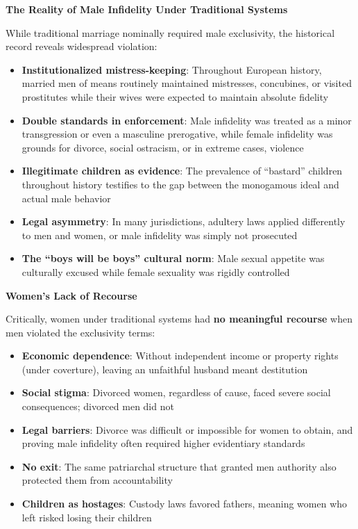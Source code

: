 \documentclass[12pt,openany]{book}
\numberwithin{equation}{chapter}
\begin{document}
\textbf{The Reality of Male Infidelity Under Traditional Systems}

While traditional marriage nominally required male exclusivity, the historical record reveals widespread violation:

\begin{itemize}
    \item \textbf{Institutionalized mistress-keeping}: Throughout European history, married men of means routinely maintained mistresses, concubines, or visited prostitutes while their wives were expected to maintain absolute fidelity
    \item \textbf{Double standards in enforcement}: Male infidelity was treated as a minor transgression or even a masculine prerogative, while female infidelity was grounds for divorce, social ostracism, or in extreme cases, violence
    \item \textbf{Illegitimate children as evidence}: The prevalence of ``bastard'' children throughout history testifies to the gap between the monogamous ideal and actual male behavior
    \item \textbf{Legal asymmetry}: In many jurisdictions, adultery laws applied differently to men and women, or male infidelity was simply not prosecuted
    \item \textbf{The ``boys will be boys'' cultural norm}: Male sexual appetite was culturally excused while female sexuality was rigidly controlled
\end{itemize}

\textbf{Women's Lack of Recourse}

Critically, women under traditional systems had \textbf{no meaningful recourse} when men violated the exclusivity terms:

\begin{itemize}
    \item \textbf{Economic dependence}: Without independent income or property rights (under coverture), leaving an unfaithful husband meant destitution
    \item \textbf{Social stigma}: Divorced women, regardless of cause, faced severe social consequences; divorced men did not
    \item \textbf{Legal barriers}: Divorce was difficult or impossible for women to obtain, and proving male infidelity often required higher evidentiary standards
    \item \textbf{No exit}: The same patriarchal structure that granted men authority also protected them from accountability
    \item \textbf{Children as hostages}: Custody laws favored fathers, meaning women who left risked losing their children
\end{itemize}
\end{document}
